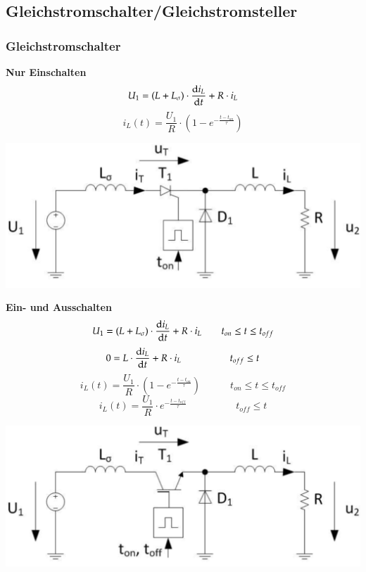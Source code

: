 \subsection{Gleichstromschalter/Gleichstromsteller}
\subsubsection{Gleichstromschalter}
\begin{minipage}{0.5\linewidth}
    \textbf{Nur Einschalten}\newline
    \[ U_1=(L + L_{\sigma})\cdot \frac{\mathop{}\!\mathrm{d} i_L}{\mathop{}\!\mathrm{d} t}+R\cdot i_L \]
    \[ i_L(t)=\frac{U_1}{R}\cdot(1-e^{-\frac{t-t_{on}}{\tau}})\]
\end{minipage}
\begin{minipage}{0.4\linewidth}
    \includegraphics[width=1.2\linewidth]{images/GsSchalterOn}
\end{minipage}

\begin{minipage}{0.5\linewidth}
\textbf{Ein- und Ausschalten}\newline
\[ U_1=(L + L_{\sigma})\cdot \frac{\mathop{}\!\mathrm{d} i_L}{\mathop{}\!\mathrm{d} t}+R\cdot i_L \qquad t_{on} \leq t \leq t_{off}\]
\[ 0=L\cdot \frac{\mathop{}\!\mathrm{d} i_L}{\mathop{}\!\mathrm{d} t}+ R\cdot i_L \qquad \qquad \quad t_{off}\leq t \]
\[ i_L(t)=\frac{U_1}{R}\cdot(1-e^{-\frac{t-t_{on}}{\tau}}) \qquad \quad t_{on} \leq t \leq t_{off}\]
\[ i_L(t)=\frac{U_1}{R}\cdot e^{-\frac{t-t_{off}}{\tau}} \qquad \quad \qquad t_{off}\leq t \]
\end{minipage}
\begin{minipage}{0.4\linewidth}
    \includegraphics[width=1.2\linewidth]{images/GsSchalterOnOff}
\end{minipage}

